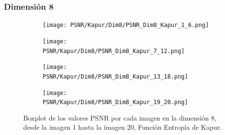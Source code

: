 \documentclass[conference]{IEEEtran}
\begin{document}
\subsubsection{Dimensión 8}
\begin{figure}[htbp] %
	\centering %
	\begin{subfigure}{0.4\textwidth}
		\texttt{[image: PSNR/Kapur/Dim8/PSNR\_Dim8\_Kapur\_1\_6.png]}
	\end{subfigure}
	
	\begin{subfigure}{0.4\textwidth}
		\texttt{[image: PSNR/Kapur/Dim8/PSNR\_Dim8\_Kapur\_7\_12.png]}
	\end{subfigure}
	
	\begin{subfigure}{0.4\textwidth}
		\texttt{[image: PSNR/Kapur/Dim8/PSNR\_Dim8\_Kapur\_13\_18.png]}
	\end{subfigure}
	
	\begin{subfigure}{0.4\textwidth}
		\texttt{[image: PSNR/Kapur/Dim8/PSNR\_Dim8\_Kapur\_19\_20.png]}
		\vspace{-120pt} %
	\end{subfigure}
	\caption{Boxplot de los valores PSNR por cada imagen en la dimensión 8, desde la imagen 1 hasta la imagen 20, Función Entropía de Kapur.}
	\label{fig:imagenes_dim8_1_20}    
\end{figure}
\end{document}
